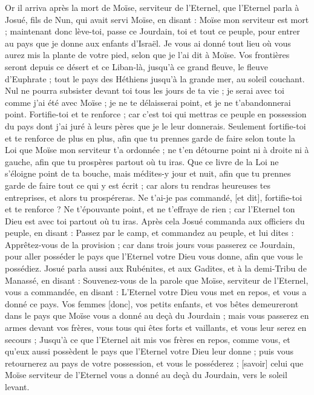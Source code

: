 \BFont
\begin{multicols}{2}
\VerseOne{}Or il arriva après la mort de Moïse, serviteur de l'Eternel, que l'Eternel parla à Josué, fils de Nun, qui avait servi Moïse, en disant :
Moïse mon serviteur est mort ; maintenant donc lève-toi, passe ce Jourdain, toi et tout ce peuple, pour entrer au pays que je donne aux enfants d'Israël.
Je vous ai donné tout lieu où vous aurez mis la plante de votre pied, selon que je l'ai dit à Moïse.
Vos frontières seront depuis ce désert et ce Liban-là, jusqu'à ce grand fleuve, le fleuve d'Euphrate ; tout le pays des Héthiens jusqu'à la grande mer, au soleil couchant.
Nul ne pourra subsister devant toi tous les jours de ta vie ; je serai avec toi comme j'ai été avec Moïse ; je ne te délaisserai point, et je ne t'abandonnerai point.
Fortifie-toi et te renforce ; car c'est toi qui mettras ce peuple en possession du pays dont j'ai juré à leurs pères que je le leur donnerais.
Seulement fortifie-toi et te renforce de plus en plus, afin que tu prennes garde de faire selon toute la Loi que Moïse mon serviteur t'a ordonnée ; ne t'en détourne point ni à droite ni à gauche, afin que tu prospères partout où tu iras.
Que ce livre de la Loi ne s'éloigne point de ta bouche, mais médites-y jour et nuit, afin que tu prennes garde de faire tout ce qui y est écrit ; car alors tu rendras heureuses tes entreprises, et alors tu prospéreras.
Ne t'ai-je pas commandé, [et dit], fortifie-toi et te renforce ? Ne t'épouvante point, et ne t'effraye de rien ; car l'Eternel ton Dieu est avec toi partout où tu iras.
Après cela Josué commanda aux officiers du peuple, en disant :
Passez par le camp, et commandez au peuple, et lui dites : Apprêtez-vous de la provision ; car dans trois jours vous passerez ce Jourdain, pour aller posséder le pays que l'Eternel votre Dieu vous donne, afin que vous le possédiez.
Josué parla aussi aux Rubénites, et aux Gadites, et à la demi-Tribu de Manassé, en disant :
Souvenez-vous de la parole que Moïse, serviteur de l'Eternel, vous a commandée, en disant : L'Eternel votre Dieu vous met en repos, et vous a donné ce pays.
Vos femmes [donc], vos petits enfants, et vos bêtes demeureront dans le pays que Moïse vous a donné au deçà du Jourdain ; mais vous passerez en armes devant vos frères, vous tous qui êtes forts et vaillants, et vous leur serez en secours ;
Jusqu'à ce que l'Eternel ait mis vos frères en repos, comme vous, et qu'eux aussi possèdent le pays que l'Eternel votre Dieu leur donne ; puis vous retournerez au pays de votre possession, et vous le posséderez ; [savoir] celui que Moïse serviteur de l'Eternel vous a donné au deçà du Jourdain, vers le soleil levant.

\end{multicols}
